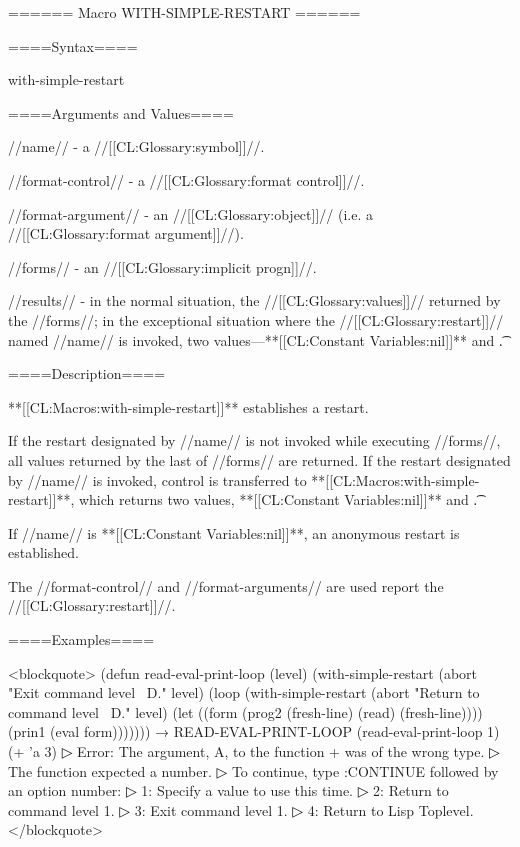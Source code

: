 ====== Macro WITH-SIMPLE-RESTART ======

====Syntax====

\DefmacWithValuesNewline with-simple-restart { } {}

====Arguments and Values====

//name// - a //[[CL:Glossary:symbol]]//.

//format-control// - a //[[CL:Glossary:format control]]//.

//format-argument// - an //[[CL:Glossary:object]]// (i.e. a //[[CL:Glossary:format argument]]//).

//forms// - an //[[CL:Glossary:implicit progn]]//.

//results// - in the normal situation, the //[[CL:Glossary:values]]// returned by the //forms//; in the exceptional situation where the //[[CL:Glossary:restart]]// named //name// is invoked, two values---**[[CL:Constant Variables:nil]]** and \t.

====Description====

**[[CL:Macros:with-simple-restart]]** establishes a restart.

If the restart designated by //name// is not invoked while executing //forms//, all values returned by the last of //forms// are returned. If the restart designated by //name// is invoked, control is transferred to **[[CL:Macros:with-simple-restart]]**, which returns two values, **[[CL:Constant Variables:nil]]** and \t.

If //name// is **[[CL:Constant Variables:nil]]**, an anonymous restart is established.

The //format-control// and //format-arguments// are used report the //[[CL:Glossary:restart]]//.

====Examples====

<blockquote> (defun read-eval-print-loop (level) (with-simple-restart (abort "Exit command level ~D." level) (loop (with-simple-restart (abort "Return to command level ~D." level) (let ((form (prog2 (fresh-line) (read) (fresh-line)))) (prin1 (eval form))))))) → READ-EVAL-PRINT-LOOP (read-eval-print-loop 1) (+ 'a 3)
▷ Error: The argument, A, to the function + was of the wrong type.
▷ The function expected a number.
▷ To continue, type :CONTINUE followed by an option number:
▷ 1: Specify a value to use this time.
▷ 2: Return to command level 1.
▷ 3: Exit command level 1.
▷ 4: Return to Lisp Toplevel. </blockquote>


